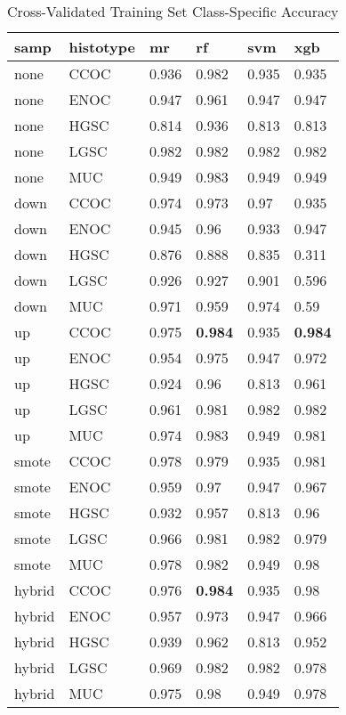 \documentclass[
]{report}
\begin{document}
\begin{table}

\caption{\label{tab:train-accuracy-class-table}Cross-Validated Training Set Class-Specific Accuracy}
\centering
\begin{tabular}[t]{l|l|l|l|l|l}
\hline
samp & histotype & mr & rf & svm & xgb\\
\hline
none & CCOC & 0.936 & 0.982 & 0.935 & 0.935\\
\hline
none & ENOC & 0.947 & 0.961 & 0.947 & 0.947\\
\hline
none & HGSC & 0.814 & 0.936 & 0.813 & 0.813\\
\hline
none & LGSC & 0.982 & 0.982 & 0.982 & 0.982\\
\hline
none & MUC & 0.949 & 0.983 & 0.949 & 0.949\\
\hline
down & CCOC & 0.974 & 0.973 & 0.97 & 0.935\\
\hline
down & ENOC & 0.945 & 0.96 & 0.933 & 0.947\\
\hline
down & HGSC & 0.876 & 0.888 & 0.835 & 0.311\\
\hline
down & LGSC & 0.926 & 0.927 & 0.901 & 0.596\\
\hline
down & MUC & 0.971 & 0.959 & 0.974 & 0.59\\
\hline
up & CCOC & 0.975 & \textbf{0.984} & 0.935 & \textbf{0.984}\\
\hline
up & ENOC & 0.954 & 0.975 & 0.947 & 0.972\\
\hline
up & HGSC & 0.924 & 0.96 & 0.813 & 0.961\\
\hline
up & LGSC & 0.961 & 0.981 & 0.982 & 0.982\\
\hline
up & MUC & 0.974 & 0.983 & 0.949 & 0.981\\
\hline
smote & CCOC & 0.978 & 0.979 & 0.935 & 0.981\\
\hline
smote & ENOC & 0.959 & 0.97 & 0.947 & 0.967\\
\hline
smote & HGSC & 0.932 & 0.957 & 0.813 & 0.96\\
\hline
smote & LGSC & 0.966 & 0.981 & 0.982 & 0.979\\
\hline
smote & MUC & 0.978 & 0.982 & 0.949 & 0.98\\
\hline
hybrid & CCOC & 0.976 & \textbf{0.984} & 0.935 & 0.98\\
\hline
hybrid & ENOC & 0.957 & 0.973 & 0.947 & 0.966\\
\hline
hybrid & HGSC & 0.939 & 0.962 & 0.813 & 0.952\\
\hline
hybrid & LGSC & 0.969 & 0.982 & 0.982 & 0.978\\
\hline
hybrid & MUC & 0.975 & 0.98 & 0.949 & 0.978\\
\hline
\end{tabular}
\end{table}
\end{document}
